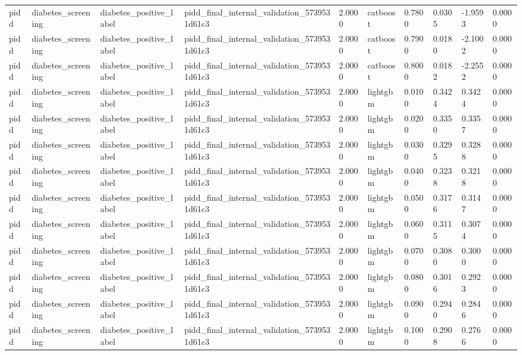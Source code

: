 \begin{tabular}{llllllllll}
pidd & diabetes\_screening & diabetes\_positive\_label & pidd\_final\_internal\_validation\_5739531d61c3 & 2.0000 & catboost & 0.7800 & 0.0305 & -1.9593 & 0.0000 \\
pidd & diabetes\_screening & diabetes\_positive\_label & pidd\_final\_internal\_validation\_5739531d61c3 & 2.0000 & catboost & 0.7900 & 0.0180 & -2.1002 & 0.0000 \\
pidd & diabetes\_screening & diabetes\_positive\_label & pidd\_final\_internal\_validation\_5739531d61c3 & 2.0000 & catboost & 0.8000 & 0.0182 & -2.2552 & 0.0000 \\
pidd & diabetes\_screening & diabetes\_positive\_label & pidd\_final\_internal\_validation\_5739531d61c3 & 2.0000 & lightgbm & 0.0100 & 0.3424 & 0.3424 & 0.0000 \\
pidd & diabetes\_screening & diabetes\_positive\_label & pidd\_final\_internal\_validation\_5739531d61c3 & 2.0000 & lightgbm & 0.0200 & 0.3350 & 0.3357 & 0.0000 \\
pidd & diabetes\_screening & diabetes\_positive\_label & pidd\_final\_internal\_validation\_5739531d61c3 & 2.0000 & lightgbm & 0.0300 & 0.3295 & 0.3288 & 0.0000 \\
pidd & diabetes\_screening & diabetes\_positive\_label & pidd\_final\_internal\_validation\_5739531d61c3 & 2.0000 & lightgbm & 0.0400 & 0.3238 & 0.3218 & 0.0000 \\
pidd & diabetes\_screening & diabetes\_positive\_label & pidd\_final\_internal\_validation\_5739531d61c3 & 2.0000 & lightgbm & 0.0500 & 0.3176 & 0.3147 & 0.0000 \\
pidd & diabetes\_screening & diabetes\_positive\_label & pidd\_final\_internal\_validation\_5739531d61c3 & 2.0000 & lightgbm & 0.0600 & 0.3115 & 0.3074 & 0.0000 \\
pidd & diabetes\_screening & diabetes\_positive\_label & pidd\_final\_internal\_validation\_5739531d61c3 & 2.0000 & lightgbm & 0.0700 & 0.3080 & 0.3000 & 0.0000 \\
pidd & diabetes\_screening & diabetes\_positive\_label & pidd\_final\_internal\_validation\_5739531d61c3 & 2.0000 & lightgbm & 0.0800 & 0.3016 & 0.2923 & 0.0000 \\
pidd & diabetes\_screening & diabetes\_positive\_label & pidd\_final\_internal\_validation\_5739531d61c3 & 2.0000 & lightgbm & 0.0900 & 0.2940 & 0.2846 & 0.0000 \\
pidd & diabetes\_screening & diabetes\_positive\_label & pidd\_final\_internal\_validation\_5739531d61c3 & 2.0000 & lightgbm & 0.1000 & 0.2908 & 0.2766 & 0.0000 \\

\end{tabular}
